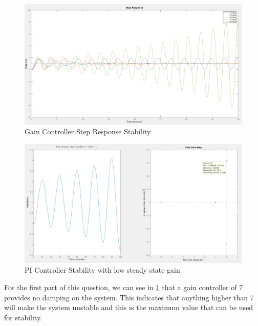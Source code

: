 \documentclass[a4paper, 12pt]{article}
\begin{document}
        

        \begin{figure}[!h]
            \centering
            \includegraphics[width=\textwidth]{q5.png}
            \caption{Gain Controller Step Response Stability}
            \label{fig:q5a}
        \end{figure}

        \begin{figure}[!h]
            \centering
            \includegraphics[width=\textwidth]{q5b.png}
            \caption{PI Controller Stability with low steady state gain}
            \label{fig:q5b}
        \end{figure}

        For the first part of this question, we can see in \cref{fig:q5a} that a gain controller of 7 provides no damping on the system. This indicates that anything higher than 7 will make the system unstable and this is the maximum value that can be used for stability.
\end{document}
